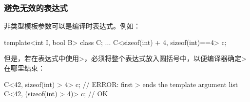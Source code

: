 \subsubsection{避免无效的表达式}

非类型模板参数可以是编译时表达式。例如：

\begin{cpp}
template<int I, bool B>
class C;
...
C<sizeof(int) + 4, sizeof(int)==4> c;
\end{cpp}

但是，若在表达式中使用>，必须将整个表达式放入圆括号中，以便编译器确定>在哪里结束：

\begin{cpp}
C<42, sizeof(int) > 4> c; // ERROR: first > ends the template argument list
C<42, (sizeof(int) > 4)> c; // OK
\end{cpp}











